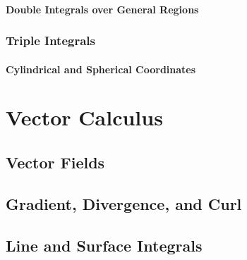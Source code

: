     \subsubsection{Double Integrals over General Regions}
    \subsection{Triple Integrals}
    \subsubsection{Cylindrical and Spherical Coordinates}


\chapterspaceabove{6.75cm} 
\chapterspacebelow{7.25cm}     
\chapter{Vector Calculus}
    \section{Vector Fields}
    \section{Gradient, Divergence, and Curl}
    \section{Line and Surface Integrals}